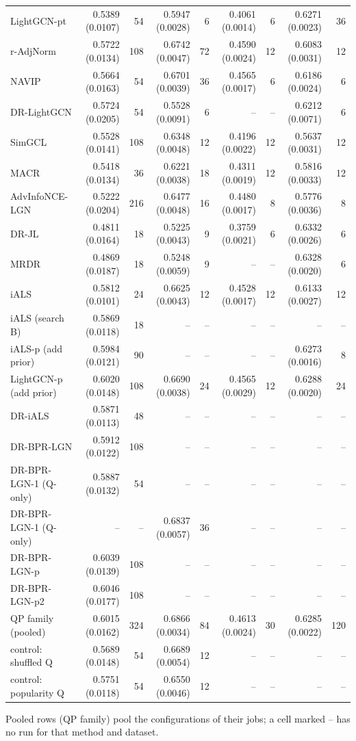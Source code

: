 \begin{table}[htbp]
{\begin{tabular}{lrrrrrrrr}
LightGCN-pt & 0.5389 (0.0107) & 54 & 0.5947 (0.0028) & 6 & 0.4061 (0.0014) & 6 & 0.6271 (0.0023) & 36 \\
r-AdjNorm & 0.5722 (0.0134) & 108 & 0.6742 (0.0047) & 72 & 0.4590 (0.0024) & 12 & 0.6083 (0.0031) & 12 \\
NAVIP & 0.5664 (0.0163) & 54 & 0.6701 (0.0039) & 36 & 0.4565 (0.0017) & 6 & 0.6186 (0.0024) & 6 \\
DR-LightGCN & 0.5724 (0.0205) & 54 & 0.5528 (0.0091) & 6 & -- & -- & 0.6212 (0.0071) & 6 \\
SimGCL & 0.5528 (0.0141) & 108 & 0.6348 (0.0048) & 12 & 0.4196 (0.0022) & 12 & 0.5637 (0.0031) & 12 \\
MACR & 0.5418 (0.0134) & 36 & 0.6221 (0.0038) & 18 & 0.4311 (0.0019) & 12 & 0.5816 (0.0033) & 12 \\
AdvInfoNCE-LGN & 0.5222 (0.0204) & 216 & 0.6477 (0.0048) & 16 & 0.4480 (0.0017) & 8 & 0.5776 (0.0036) & 8 \\
DR-JL & 0.4811 (0.0164) & 18 & 0.5225 (0.0043) & 9 & 0.3759 (0.0021) & 6 & 0.6332 (0.0026) & 6 \\
MRDR & 0.4869 (0.0187) & 18 & 0.5248 (0.0059) & 9 & -- & -- & 0.6328 (0.0020) & 6 \\
iALS & 0.5812 (0.0101) & 24 & 0.6625 (0.0043) & 12 & 0.4528 (0.0017) & 12 & 0.6133 (0.0027) & 12 \\
iALS (search B) & 0.5869 (0.0118) & 18 & -- & -- & -- & -- & -- & -- \\
iALS-p (add prior) & 0.5984 (0.0121) & 90 & -- & -- & -- & -- & 0.6273 (0.0016) & 8 \\
LightGCN-p (add prior) & 0.6020 (0.0148) & 108 & 0.6690 (0.0038) & 24 & 0.4565 (0.0029) & 12 & 0.6288 (0.0020) & 24 \\
DR-iALS & 0.5871 (0.0113) & 48 & -- & -- & -- & -- & -- & -- \\
DR-BPR-LGN & 0.5912 (0.0122) & 108 & -- & -- & -- & -- & -- & -- \\
DR-BPR-LGN-1 (Q-only) & 0.5887 (0.0132) & 54 & -- & -- & -- & -- & -- & -- \\
DR-BPR-LGN-1 (Q-only) & -- & -- & 0.6837 (0.0057) & 36 & -- & -- & -- & -- \\
DR-BPR-LGN-p & 0.6039 (0.0139) & 108 & -- & -- & -- & -- & -- & -- \\
DR-BPR-LGN-p2 & 0.6046 (0.0177) & 108 & -- & -- & -- & -- & -- & -- \\
QP family (pooled) & 0.6015 (0.0162) & 324 & 0.6866 (0.0034) & 84 & 0.4613 (0.0024) & 30 & 0.6285 (0.0022) & 120 \\
control: shuffled Q & 0.5689 (0.0148) & 54 & 0.6689 (0.0054) & 12 & -- & -- & -- & -- \\
control: popularity Q & 0.5751 (0.0118) & 54 & 0.6550 (0.0046) & 12 & -- & -- & -- & -- \\
\bottomrule
\end{tabular}}
\par\smallskip\raggedright\footnotesize Pooled rows (QP family) pool the configurations of their jobs; a cell marked -- has no run for that method and dataset.
\end{table}
